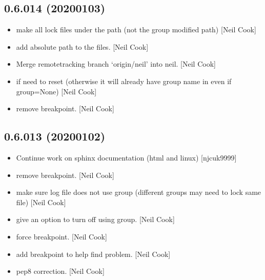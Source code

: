 \documentclass[a4paper,10pt,english]{report}
\begin{document}
\subsection{0.6.014 (2020\sphinxhyphen{}01\sphinxhyphen{}03)}
\label{\detokenize{misc/changelog:id23}}\begin{itemize}
\item {} 
 \sphinxhyphen{} make all lock files under the  path (not
the group modified path) {[}Neil Cook{]}

\item {} 
 \sphinxhyphen{} add absolute path to the files. {[}Neil Cook{]}

\item {} 
Merge remote\sphinxhyphen{}tracking branch ‘origin/neil’ into neil. {[}Neil Cook{]}

\item {} 
 \sphinxhyphen{} if  need to reset 
(otherwise it will already have group name in even if group=None)
{[}Neil Cook{]}

\item {} 
 \sphinxhyphen{} remove breakpoint. {[}Neil Cook{]}

\end{itemize}


\subsection{0.6.013 (2020\sphinxhyphen{}01\sphinxhyphen{}02)}
\label{\detokenize{misc/changelog:id24}}\begin{itemize}
\item {} 
Continue work on sphinx documentation (html and linux) {[}njcuk9999{]}

\item {} 
 \sphinxhyphen{} remove breakpoint. {[}Neil Cook{]}

\item {} 
 \sphinxhyphen{} make sure log file does not use group
(different groups may need to lock same file) {[}Neil Cook{]}

\item {} 
 \sphinxhyphen{} give an option to turn off using group. {[}Neil
Cook{]}

\item {} 
 \sphinxhyphen{} force breakpoint. {[}Neil Cook{]}

\item {} 
 \sphinxhyphen{} add breakpoint to help find
problem. {[}Neil Cook{]}

\item {} 
 \sphinxhyphen{} pep8 correction. {[}Neil Cook{]}

\end{itemize}
\end{document}
